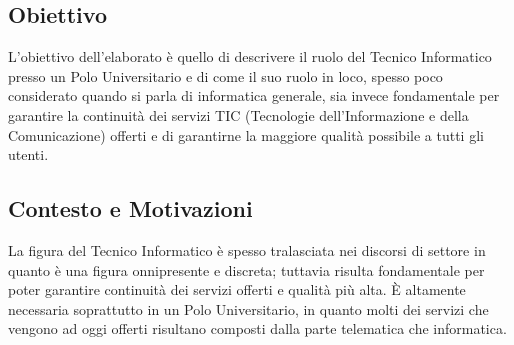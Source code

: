     \subsection*{Obiettivo}
        \par
            L'obiettivo dell'elaborato è quello di descrivere il ruolo del Tecnico Informatico presso un Polo Universitario e di come il suo ruolo in loco, spesso poco considerato quando si parla di informatica generale, sia invece fondamentale per garantire la continuità dei servizi TIC (Tecnologie dell'Informazione e della Comunicazione) offerti e di garantirne la maggiore qualità possibile a tutti gli utenti. 
    \subsection*{Contesto e Motivazioni}
        \par
            La figura del Tecnico Informatico è spesso tralasciata nei discorsi di settore in quanto è una figura onnipresente e discreta; tuttavia risulta fondamentale per poter garantire continuità dei servizi offerti e qualità più alta. È altamente necessaria soprattutto in un Polo Universitario, in quanto molti dei servizi che vengono ad oggi offerti risultano composti dalla parte telematica che informatica.
    